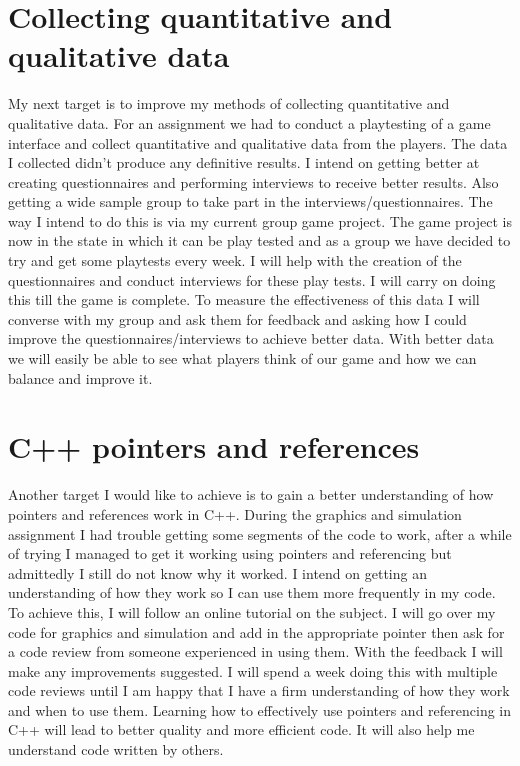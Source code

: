 \documentclass{scrartcl}
\begin{document}
\section{Collecting quantitative and qualitative data}
My next target is to improve my methods of collecting quantitative and qualitative data. For an assignment we had to conduct a playtesting of a game interface and collect quantitative and qualitative data from the players. The data I collected didn’t produce any definitive results. I intend on getting better at creating questionnaires and performing interviews to receive better results. Also getting a wide sample group to take part in the interviews/questionnaires.
\newline
\newline
The way I intend to do this is via my current group game project. The game project is now in the state in which it can be play tested and as a group we have decided to try and get some playtests every week. I will help with the creation of the questionnaires and conduct interviews for these play tests. I will carry on doing this till the game is complete. To measure the effectiveness of this data I will converse with my group and ask them for feedback and asking how I could improve the questionnaires/interviews to achieve better data.
\newline
\newline
With better data we will easily be able to see what players think of our game and how we can balance and improve it.

\section{C++ pointers and references}
Another target I would like to achieve is to gain a better understanding of how pointers and references work in C++. During the graphics and simulation assignment I had trouble getting some segments of the code to work, after a while of trying I managed to get it working using pointers and referencing but admittedly I still do not know why it worked. I intend on getting an understanding of how they work so I can use them more frequently in my code.
\newline
\newline
To achieve this, I will follow an online tutorial on the subject. I will go over my code for graphics and simulation and add in the appropriate pointer then ask for a code review from someone experienced in using them. With the feedback I will make any improvements suggested. I will spend a week doing this with multiple code reviews until I am happy that I have a firm understanding of how they work and when to use them.
\newline
\newline
Learning how to effectively use pointers and referencing in C++ will lead to better quality and more efficient code. It will also help me understand code written by others.
\end{document}
